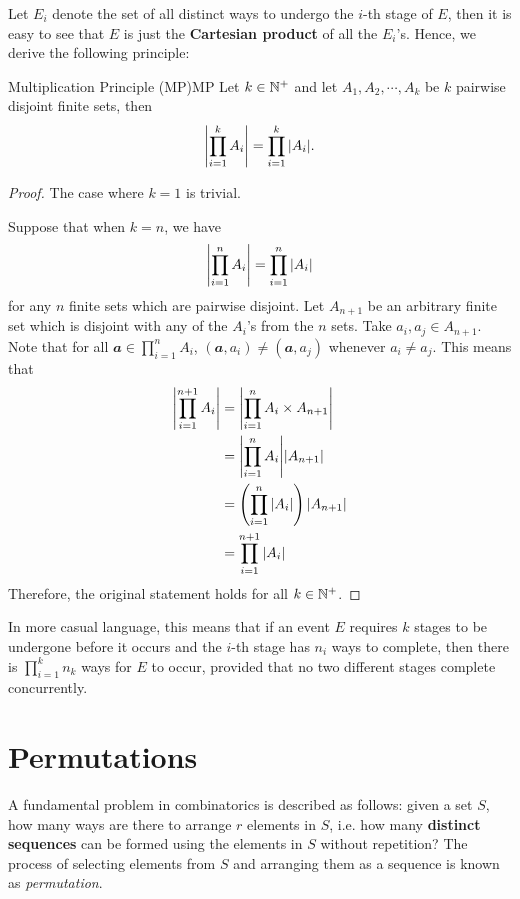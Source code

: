 \documentclass[math]{amznotes}
\theoremstyle{remark}
\begin{document}
Let $E_i$ denote the set of all distinct ways to undergo the $i$-th stage of $E$, then it is easy to see that $E$ is just the \textbf{Cartesian product} of all the $E_i$'s. Hence, we derive the following principle:
\begin{thmbox}{Multiplication Principle (MP)}{MP}
    Let $k \in \mathbb{N}^+$ and let $A_1, A_2, \cdots, A_k$ be $k$ pairwise disjoint finite sets, then
    \begin{equation*}
        {\left\lvert {\prod_{i = 1}^{k}A_i} \right\rvert} = \prod_{i = 1}^{k}{\left\lvert {A_i} \right\rvert}.
    \end{equation*}
    \tcblower
    \begin{proof}
        The case where $k = 1$ is trivial.

        Suppose that when $k = n$, we have
        \begin{equation*}
            {\left\lvert {\prod_{i = 1}^{n}A_i} \right\rvert} = \prod_{i = 1}^{n}{\left\lvert {A_i} \right\rvert}
        \end{equation*} 
        for any $n$ finite sets which are pairwise disjoint. Let $A_{n + 1}$ be an arbitrary finite set which is disjoint with any of the $A_i$'s from the $n$ sets. Take $a_i, a_j \in A_{n + 1}$. Note that for all $\mathbfit{a} \in \prod_{i = 1}^{n}A_i$, $(\mathbfit{a}, a_i) \neq (\mathbfit{a}, a_j)$ whenever $a_i \neq a_j$. This means that
        \begin{align*}
            {\left\lvert {\prod_{i = 1}^{n + 1}A_i} \right\rvert} & = {\left\lvert {\prod_{i = 1}^{n}A_i \times A_{n + 1}} \right\rvert} \\
            & = {\left\lvert {\prod_{i = 1}^{n}A_i} \right\rvert}{\left\lvert {A_{n + 1}} \right\rvert} \\
            & = \left(\prod_{i = 1}^{n}{\left\lvert {A_i} \right\rvert}\right){\left\lvert {A_{n + 1}} \right\rvert} \\
            & = \prod_{i = 1}^{n + 1}{\left\lvert {A_i} \right\rvert}
        \end{align*}
        Therefore, the original statement holds for all $k \in \mathbb{N}^+$.
    \end{proof}
\end{thmbox}
\begin{notebox}
    In more casual language, this means that if an event $E$ requires $k$ stages to be undergone before it occurs and the $i$-th stage has $n_i$ ways to complete, then there is $\prod_{i = 1}^{k}n_k$ ways for $E$ to occur, provided that no two different stages complete concurrently.
\end{notebox}
\section{Permutations}
A fundamental problem in combinatorics is described as follows: given a set $S$, how many ways are there to arrange $r$ elements in $S$, i.e. how many \textbf{distinct sequences} can be formed using the elements in $S$ without repetition? The process of selecting elements from $S$ and arranging them as a sequence is known as \textit{permutation}.
\end{document}
